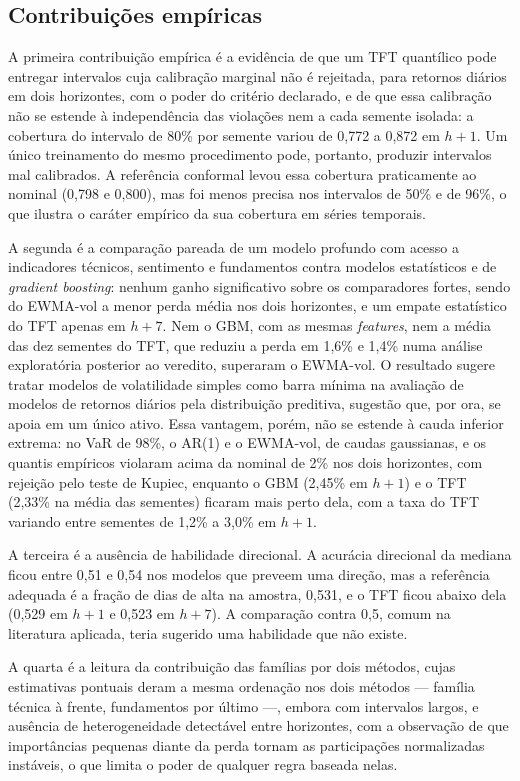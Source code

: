 \subsection{Contribuições empíricas}
A primeira contribuição empírica é a evidência de que um TFT quantílico pode entregar intervalos cuja calibração marginal não é rejeitada, para retornos diários em dois horizontes, com o poder do critério declarado, e de que essa calibração não se estende à independência das violações nem a cada semente isolada: a cobertura do intervalo de 80\% por semente variou de 0,772 a 0,872 em \(h+1\). Um único treinamento do mesmo procedimento pode, portanto, produzir intervalos mal calibrados. A referência conformal levou essa cobertura praticamente ao nominal (0,798 e 0,800), mas foi menos precisa nos intervalos de 50\% e de 96\%, o que ilustra o caráter empírico da sua cobertura em séries temporais.

A segunda é a comparação pareada de um modelo profundo com acesso a indicadores técnicos, sentimento e fundamentos contra modelos estatísticos e de \textit{gradient boosting}: nenhum ganho significativo sobre os comparadores fortes, sendo do EWMA-vol a menor perda média nos dois horizontes, e um empate estatístico do TFT apenas em \(h+7\). Nem o GBM, com as mesmas \textit{features}, nem a média das dez sementes do TFT, que reduziu a perda em 1,6\% e 1,4\% numa análise exploratória posterior ao veredito, superaram o EWMA-vol. O resultado sugere tratar modelos de volatilidade simples como barra mínima na avaliação de modelos de retornos diários pela distribuição preditiva, sugestão que, por ora, se apoia em um único ativo. Essa vantagem, porém, não se estende à cauda inferior extrema: no VaR de 98\%, o AR(1) e o EWMA-vol, de caudas gaussianas, e os quantis empíricos violaram acima da nominal de 2\% nos dois horizontes, com rejeição pelo teste de Kupiec, enquanto o GBM (2,45\% em \(h+1\)) e o TFT (2,33\% na média das sementes) ficaram mais perto dela, com a taxa do TFT variando entre sementes de 1,2\% a 3,0\% em \(h+1\).

A terceira é a ausência de habilidade direcional. A acurácia direcional da mediana ficou entre 0,51 e 0,54 nos modelos que preveem uma direção, mas a referência adequada é a fração de dias de alta na amostra, 0,531, e o TFT ficou abaixo dela (0,529 em \(h+1\) e 0,523 em \(h+7\)). A comparação contra 0,5, comum na literatura aplicada, teria sugerido uma habilidade que não existe.

A quarta é a leitura da contribuição das famílias por dois métodos, cujas estimativas pontuais deram a mesma ordenação nos dois métodos --- família técnica à frente, fundamentos por último ---, embora com intervalos largos, e ausência de heterogeneidade detectável entre horizontes, com a observação de que importâncias pequenas diante da perda tornam as participações normalizadas instáveis, o que limita o poder de qualquer regra baseada nelas.


